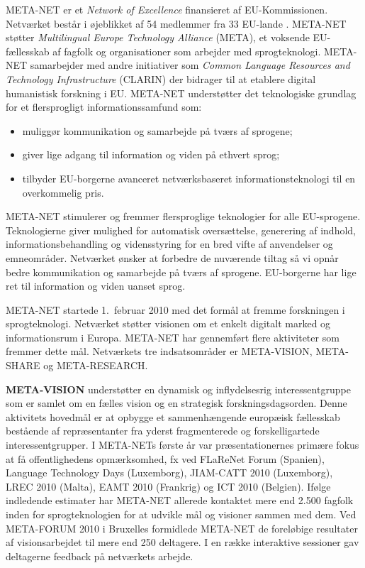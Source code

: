 \begin{multicols}{2}

 META-NET er et {\it Network of Excellence} finansieret af EU-Kommissionen. Netv\ae rket best\aa r i \o jeblikket af 54 medlemmer fra 33 EU-lande \cite{rehm2011}. META-NET st\o tter {\it Multilingual Europe Technology Alliance} (META), et voksende EU-f\ae llesskab af fagfolk og organisationer som arbejder med sprogteknologi. 
META-NET samarbejder med andre initiativer som {\it Common Language Resources and Technology Infrastructure} (CLARIN) der bidrager til at etablere digital humanistisk forskning i EU. META-NET underst\o tter det teknologiske grundlag for et flersprogligt informationssamfund som:
  \begin{itemize}
      \item muligg\o r kommunikation og samarbejde \mbox{p\aa} tv\ae rs af sprogene;
 \item giver lige adgang til information og viden \mbox{p\aa} ethvert sprog;
 \item	tilbyder EU-borgerne avanceret netv\ae rksbaseret informationsteknologi til en overkommelig pris.
\end{itemize}

META-NET stimulerer og fremmer flersproglige teknologier for alle EU-sprogene. Teknologierne giver mulighed for automatisk overs\ae ttelse, generering af indhold, informationsbehandling og vidensstyring for en bred vifte af anvendelser og emneomr\aa der. Netv\ae rket \o nsker at forbedre de nuv\ae rende tiltag \mbox{s\aa} vi opn\aa r bedre kommunikation og samarbejde \mbox{p\aa} tv\ae rs af sprogene. EU-borgerne har lige ret til information og viden uanset sprog. 

META-NET startede 1.\ februar 2010 med det form\aa l at fremme forskningen i sprogteknologi. Netv\ae rket st\o tter visionen om et enkelt digitalt marked og informationsrum i Europa. META-NET har gennemf\o rt flere aktiviteter som fremmer dette m\aa l. Netv\ae rkets tre indsatsomr\aa der er META-VISION, META-SHARE og META-RESEARCH.

 \textbf{META-VISION} underst\o tter en dynamisk og inflydelsesrig interessentgruppe som er samlet om en f\ae lles vision og en strategisk forskningsdagsorden. Denne aktivitets hovedm\aa l er at opbygge et sammenh\ae ngende europ\ae isk f\ae llesskab best\aa ende af repr\ae sentanter fra yderst fragmenterede og forskelligartede interessentgrupper. I META-NETs f\o rste \aa r var pr\ae sentationernes prim\ae re fokus at \mbox{f\aa} offentlighedens opm\ae rksomhed, fx ved FLaReNet Forum (Spanien), Language Technology Days (Luxemborg), JIAM-CATT 2010 (Luxemborg), LREC 2010 (Malta), EAMT 2010 (Frankrig) og ICT 2010 (Belgien). If\o lge indledende estimater har META-NET allerede kontaktet mere end 2.500 fagfolk inden for sprogteknologien for at udvikle m\aa l og visioner sammen med dem. Ved META-FORUM 2010 i Bruxelles formidlede META-NET de forel\o bige resultater af visionsarbejdet til mere end 250 deltagere. I en r\ae kke interaktive sessioner gav deltagerne feed\-back \mbox{p\aa} netv\ae rkets arbejde. 


\end{multicols}
